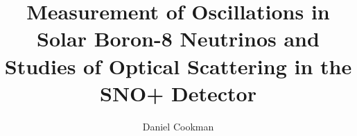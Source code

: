 \title{Measurement of Oscillations in Solar Boron-8 Neutrinos and Studies of Optical Scattering in the SNO+ Detector}


\author{Daniel Cookman}








     



\renewcommand{\submissiontext}{A thesis submitted for the degree of}




